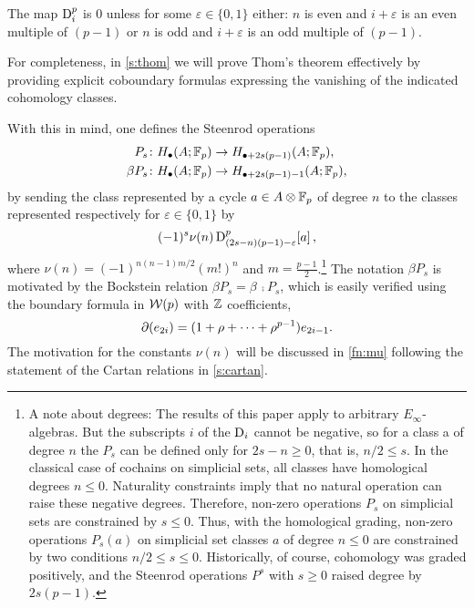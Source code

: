 \begin{theorem}[Thom]\label{t:thom}
	The map $\mathrm{D}_i^p$ is $0$ unless for some $\varepsilon \in \{0,1\}$ either: $n$ is even and $i+\varepsilon$ is an even multiple of $(p-1)$ or $n$ is odd and $i+\varepsilon$ is an odd multiple of $(p-1)$.
\end{theorem}

For completeness, in \cref{s:thom} we will prove Thom's theorem effectively by providing explicit coboundary formulas expressing the vanishing of the indicated cohomology classes.

With this in mind, one defines the Steenrod operations
\begin{align*}
	P_s \colon& H_\bullet(A; {\mathbb{F}_p}) \to H_{\bullet + 2s(p-1)}(A; {\mathbb{F}_p}), \\
	\beta P_s \colon& H_\bullet(A; {\mathbb{F}_p}) \to H_{\bullet + 2s(p-1) - 1}(A; {\mathbb{F}_p}),
\end{align*}
by sending the class represented by a cycle $a \in A \otimes {\mathbb{F}_p}$ of degree $n$ to the classes represented respectively for $\varepsilon \in \{0,1\}$ by
\begin{equation*}
	(-1)^s \nu(n) \, \mathrm{D}^p_{(2s-n)(p-1)-\varepsilon}[a] \,,
\end{equation*}
where $\nu(n) = (-1)^{n(n-1)m/2}(m!)^n$ and $m = \frac{p-1}{2}$.\footnote{
A note about degrees:
The results of this paper apply to arbitrary $E_\infty$-algebras.
But the subscripts $i$ of the $\mathrm{D}_i$ cannot be negative, so for a class a of degree $n$ the $P_s$ can be defined only for $2s-n \geq 0$, that is, $n/2 \leq s$.
In the classical case of cochains on simplicial sets, all classes have homological degrees $n \leq 0$.
Naturality constraints imply that no natural operation can raise these negative degrees.
Therefore, non-zero operations $P_s$ on simplicial sets are constrained by $s \leq 0$.
Thus, with the homological grading, non-zero operations $P_s(a)$ on simplicial set classes $a$ of degree $n \leq 0$ are constrained by two conditions $n/2 \leq s \leq 0$.
Historically, of course, cohomology was graded positively, and the Steenrod operations $P^s$ with $s \geq 0$ raised degree by $2s(p-1)$.
}
The notation $\beta P_s$ is motivated by the Bockstein relation $\beta P_s = \beta\, \comp P_s$, which is easily verified using the boundary formula in $\mathcal{W}(p)$ with $\mathbb{Z}$ coefficients,
\[
\operatorname{\partial}(e_{2i}) = (1 + \rho + \dots + \rho^{p-1})e_{2i-1}.
\]
The motivation for the constants $\nu(n)$ will be discussed in \cref{fn:mu} following the statement of the Cartan relations in \cref{s:cartan}.